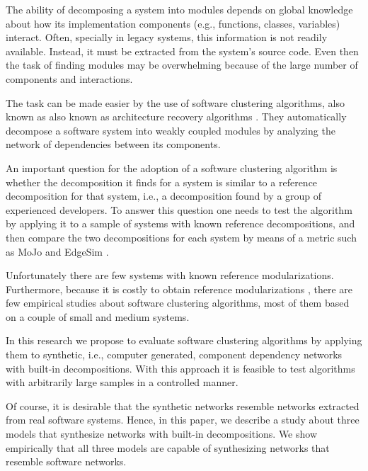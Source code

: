 The ability of decomposing a system into modules depends on global knowledge
about how its implementation components (e.g., functions, classes, variables)
interact. Often, specially in legacy systems, this information is not readily
available. Instead, it must be extracted from the system's source code. Even
then the task of finding modules may be overwhelming because of the large number
of components and interactions.

The task can be made easier by the use of software clustering algorithms, also
known as also known as architecture recovery algorithms \cite{Pollet2007}. They
automatically decompose a software system into weakly coupled modules by
analyzing the network of dependencies between its components.


An important question for the adoption of a software clustering algorithm is
whether the decomposition it finds for a system is similar to a reference
decomposition for that system, i.e., a decomposition found by a group of
experienced developers. To answer this question one needs to test the algorithm
by applying it to a sample of systems with known reference decompositions, and
then compare the two decompositions for each system by means of a metric such as
MoJo \cite{Tzerpos1999} and EdgeSim \cite{Mitchell2001}.

Unfortunately there are few systems with known reference modularizations.
Furthermore, because it is costly to obtain reference modularizations
\cite{Koschke2000}, there are few empirical studies about software clustering
algorithms, most of them based on a couple of small and medium systems.


In this research we propose to evaluate software clustering algorithms by
applying them to synthetic, i.e., computer generated, component dependency
networks with built-in decompositions. With this approach it is feasible to test
algorithms with arbitrarily large samples in a controlled manner.

Of course, it is desirable that the synthetic networks resemble networks
extracted from real software systems. Hence, in this paper, we describe a study
about three models that synthesize networks with built-in decompositions. We
show empirically that all three models are capable of synthesizing networks that
resemble software networks.

